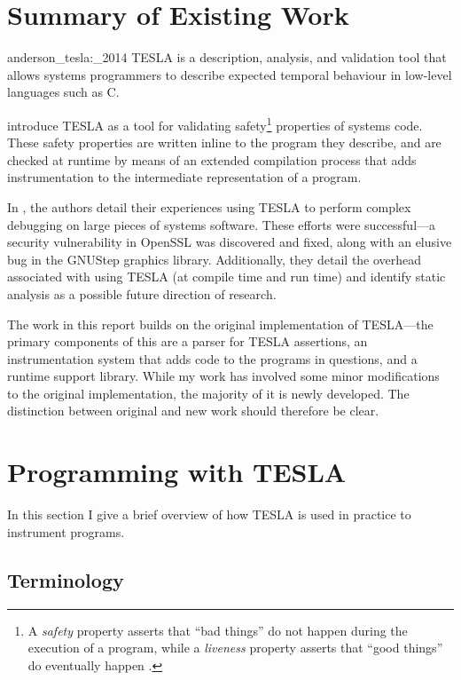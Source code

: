 \section{Summary of Existing Work}

\begin{displaycquote}[p. 1]{anderson_tesla:_2014}
TESLA is a description, analysis, and validation tool that allows systems
  programmers to describe expected temporal behaviour in low-level languages
  such as C.
\end{displaycquote}

\textcite{anderson_tesla:_2014} introduce TESLA as a tool for validating
safety\footnote{A \emph{safety} property asserts that ``bad things'' do not
happen during the execution of a program, while a \emph{liveness} property
asserts that ``good things'' do eventually happen
\cite{lamport_proving_1977,alpern_defining_1984}.} properties of systems code.
These safety properties are written inline to the program they describe, and are
checked at runtime by means of an extended compilation process that adds
instrumentation to the intermediate representation of a program.

In \cite{anderson_tesla:_2014}, the authors detail their experiences
using TESLA to perform complex debugging on large pieces of systems
software. These efforts were successful---a security vulnerability in
OpenSSL was discovered and fixed, along with an elusive bug in the
GNUStep graphics library. Additionally, they detail the overhead
associated with using TESLA (at compile time and run time) and identify
static analysis as a possible future direction of research.

The work in this report builds on the original implementation of
TESLA---the primary components of this are a parser for TESLA
assertions, an instrumentation system that adds code to the programs in
questions, and a runtime support library. While my work has involved
some minor modifications to the original implementation, the majority of
it is newly developed. The distinction between original and new work
should therefore be clear.

\section{Programming with TESLA}

In this section I give a brief overview of how TESLA is used in practice
to instrument programs.

\subsection{Terminology}

